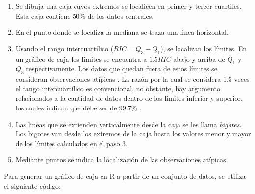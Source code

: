 \documentclass[
]{book}
\providecommand{\tightlist}{%
  \setlength{\itemsep}{0pt}\setlength{\parskip}{0pt}}
\theoremstyle{definition}
\theoremstyle{definition}
\theoremstyle{definition}
\theoremstyle{definition}
\theoremstyle{remark}
\begin{document}
\begin{enumerate}
\def\labelenumi{\arabic{enumi}.}
\tightlist
\item
  Se dibuja una caja cuyos extremos se localicen en primer y tercer cuartiles. Esta caja contiene 50\% de los datos centrales.
\item
  En el punto donde se localiza la mediana se traza una linea horizontal.
\item
  Usando el rango intercuartílico (\(RIC = Q_3-Q_1\)), se localizan los límites. En un gráfico de caja los límites se encuentra a \(1.5RIC\) abajo y arriba de \(Q_1\) y \(Q_3\) respectivamente. Los datos que quedan fuera de estos límites se consideran observaciones atípicas \citep{Tukey}. La razón por la cual se considera 1.5 veces el rango intercuartílico es convencional, no obstante, hay argumento relacionados a la cantidad de datos dentro de los limites inferior y superior, los cuales indican que debe ser de 99.7\% \citep{James2013}.
\item
  Las lineas que se extienden verticalmente desde la caja se les llama \emph{bigotes}. Los bigotes van desde los extremos de la caja hasta los valores menor y mayor de los límites calculados en el paso 3.
\item
  Mediante puntos se indica la localización de las observaciones atípicas.
\end{enumerate}

Para generar un gráfico de caja en R a partir de un conjunto de datos, se utiliza el siguiente código:
\end{document}
